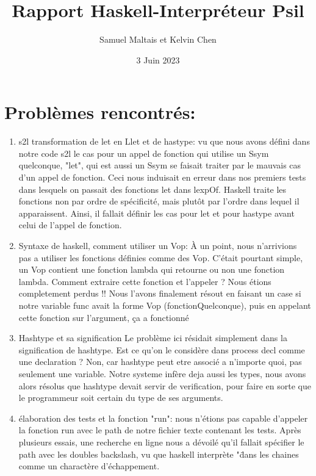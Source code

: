 \documentclass{article}
\title{Rapport Haskell-Interpréteur Psil}
\author{Samuel Maltais et Kelvin Chen}
\date{3 Juin 2023}
\begin{document}
\maketitle

\section*{Problèmes rencontrés:}
\begin{enumerate}
    \item s2l transformation de let en Llet et de hastype:
    vu que nous avons défini dans notre code s2l le cas pour un appel de fonction qui utilise un Ssym quelconque, "let", qui est aussi un Ssym se faisait traiter par le mauvais cas d'un appel de fonction. Ceci nous induisait en erreur dans nos premiers tests dans lesquels on passait des fonctions let dans lexpOf. Haskell traite les fonctions non par ordre de spécificité, mais plutôt par l'ordre dans lequel il apparaissent. Ainsi, il fallait définir les cas pour let et pour hastype avant celui de l'appel de fonction. 
    
    \item Syntaxe de haskell, comment utiliser un Vop:
    À un point, nous n'arrivions pas a utiliser les fonctions définies comme des Vop. C'était pourtant simple, un Vop contient une fonction lambda qui retourne ou non une fonction lambda. Comment extraire cette fonction et l'appeler ? Nous étions completement perdus !! Nous l'avons finalement résout en faisant un case si notre variable func avait la forme Vop (fonctionQuelconque), puis en appelant cette fonction sur l'argument, ça a fonctionné
    
    \item Hashtype et sa signification
    Le problème ici résidait simplement dans la signification de hashtype. Est ce qu'on le considère dans process decl comme une declaration ? Non, car hashtype peut etre associé a n'importe quoi, pas seulement une variable. Notre systeme infère deja aussi les types, nous avons alors résolus que hashtype devait servir de verification, pour faire en sorte que le programmeur soit certain du type de ses arguments.
    
     \item élaboration des tests et la fonction "run": 
     nous n'étions pas capable d'appeler la fonction run avec le path de notre fichier texte contenant les tests. Après plusieurs essais, une recherche en ligne nous a dévoilé qu'il fallait spécifier le path avec les doubles backslash, vu que haskell interprète "\" dans les chaines comme un charactère d'échappement. 
\end{enumerate}
\end{document}
